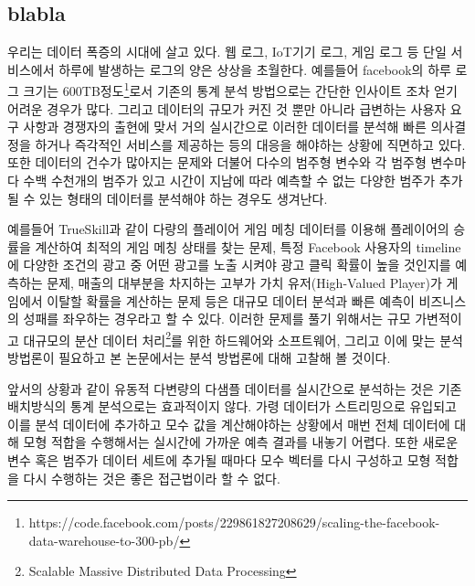 \documentclass[oneside,b5paper,11pt]{article} %
\begin{document}
\subsection{blabla}
 우리는 데이터 폭증의 시대에 살고 있다. 웹 로그, IoT기기 로그, 게임 로그 등 단일 서비스에서 하루에 발생하는 로그의 양은 상상을 초월한다. 예를들어 facebook의 하루 로그 크기는 600TB정도\footnote{https://code.facebook.com/posts/229861827208629/scaling-the-facebook-data-warehouse-to-300-pb/}로서 기존의 통계 분석 방법으로는 간단한 인사이트 조차 얻기 어려운 경우가 많다. 그리고 데이터의 규모가 커진 것 뿐만 아니라 급변하는 사용자 요구 사항과 경쟁자의 출현에 맞서 거의 실시간으로 이러한 데이터를 분석해 빠른 의사결정을 하거나 즉각적인 서비스를 제공하는 등의 대응을 해야하는 상황에 직면하고 있다. 또한 데이터의 건수가 많아지는 문제와 더불어 다수의 범주형 변수와 각 범주형 변수마다 수백 수천개의 범주가 있고 시간이 지남에 따라 예측할 수 없는 다양한 범주가 추가될 수 있는 형태의 데이터를 분석해야 하는 경우도 생겨난다.

 예를들어 TrueSkill과 같이 다량의 플레이어 게임 메칭 데이터를 이용해 플레이어의 승률을 계산하여 최적의 게임 메칭 상태를 찾는 문제\citep{Herbrich2006}, 특정 Facebook 사용자의 timeline에 다양한 조건의 광고 중 어떤 광고를 노출 시켜야 광고 클릭 확률이 높을 것인지를 예측하는 문제\citep{He2014}, 매출의 대부분을 차지하는 고부가 가치 유저(High-Valued Player)가 게임에서 이탈할 확률을 계산하는 문제\citep{Runge2014} 등은 대규모 데이터 분석과 빠른 예측이 비즈니스의 성패를 좌우하는 경우라고 할 수 있다. 이러한 문제를 풀기 위해서는 규모 가변적이고 대규모의 분산 데이터 처리\footnote{Scalable Massive Distributed Data Processing}를 위한 하드웨어와 소프트웨어, 그리고 이에 맞는 분석 방법론이 필요하고 본 논문에서는 분석 방법론에 대해 고찰해 볼 것이다.
 
 앞서의 상황과 같이 유동적 다변량의 다샘플 데이터를 실시간으로 분석하는 것은 기존 배치방식의 통계 분석으로는 효과적이지 않다. 가령 데이터가 스트리밍으로 유입되고 이를 분석 데이터에 추가하고 모수 값을 계산해야하는 상황에서 매번 전체 데이터에 대해 모형 적합을 수행해서는 실시간에 가까운 예측 결과를 내놓기 어렵다. 또한 새로운 변수 혹은 범주가 데이터 세트에 추가될 때마다 모수 벡터를 다시 구성하고 모형 적합을 다시 수행하는 것은 좋은 접근법이라 할 수 없다. 
\end{document}

